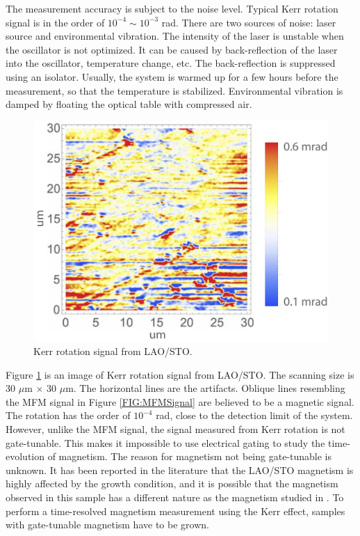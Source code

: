 \documentclass[pdflatex, sectionletters, 12pt]{pittetd}    %
\begin{document}
The measurement accuracy is subject to the noise level. Typical Kerr rotation signal is in the order of $10^{-4} \sim 10^{-3}$ rad. There are two sources of noise: laser source and environmental vibration. The intensity of the laser is unstable when the oscillator is not optimized. It can be caused by back-reflection of the laser into the oscillator, temperature change, etc. The back-reflection is suppressed using an isolator. Usually, the system is warmed up for a few hours before the measurement, so that the temperature is stabilized. Environmental vibration is damped by floating the optical table with compressed air.
\\

\begin{figure}[h!]
	\centering
	\includegraphics[width=.6\textwidth]{Drawing/KerrLAOSTO.pdf}
	\caption{Kerr rotation signal from LAO/STO.}
	\label{FIG:KerrLAOSTO}
\end{figure}

Figure \ref{FIG:KerrLAOSTO} is an image of Kerr rotation signal from LAO/STO. The scanning size is 30 $\mu$m $\times$ 30 $\mu$m. The horizontal lines are the artifacts. Oblique lines resembling the MFM signal in Figure \ref{FIG:MFMSignal} are believed to be a magnetic signal. The rotation has the order of $10^{-4}$ rad, close to the detection limit of the system. However, unlike the MFM signal, the signal measured from Kerr rotation is not gate-tunable. This makes it impossible to use electrical gating to study the time-evolution of magnetism. The reason for magnetism not being gate-tunable is unknown. It has been reported in the literature that the LAO/STO magnetism is highly affected by the growth condition\cite{ariando2011electronic, salluzzo2013origin, huijben2009structure, liu2014dominant}, and it is possible that the magnetism observed in this sample has a different nature as the magnetism studied in \cite{bi2014room}. To perform a time-resolved magnetism measurement using the Kerr effect, samples with gate-tunable magnetism have to be grown.
\end{document}
